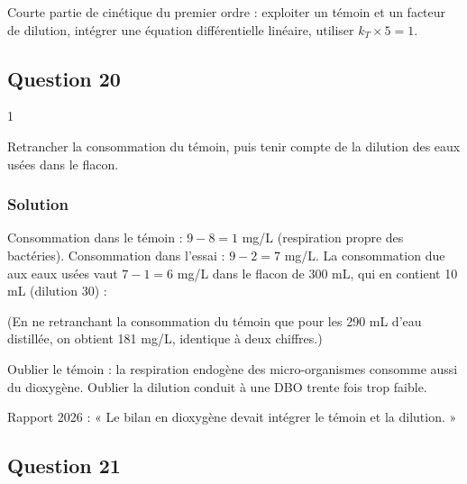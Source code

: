 \documentclass[11pt,a4paper]{article}
\newcommand{\equationajustee}[1]{%
  \sbox{\boiteequation}{$\displaystyle #1$}%
  \ifdim\wd\boiteequation>\linewidth
    \[\resizebox{\linewidth}{!}{\usebox{\boiteequation}}\]%
  \else
    \[#1\]%
  \fi}
\begin{document}
Courte partie de cinétique du premier ordre : exploiter un témoin et un facteur de dilution, intégrer une équation différentielle linéaire, utiliser \(k_T\times5=1\).

\hypertarget{question-20}{%
\subsection{Question 20}\label{question-20}}

\begin{indication}{1}

Retrancher la consommation du témoin, puis tenir compte de la dilution des eaux usées dans le flacon.

\end{indication}

\hypertarget{solution-19}{%
\subsubsection{Solution}\label{solution-19}}

Consommation dans le témoin : \(9-8=1\) mg/L (respiration propre des bactéries). Consommation dans l'essai : \(9-2=7\) mg/L. La consommation due aux eaux usées vaut \(7-1=6\) mg/L dans le flacon de 300 mL, qui en contient 10 mL (dilution 30) :

\equationajustee{\boxed{\mathrm{DBO_5}=(7-1)\times\frac{300}{10}=1{,}8\times10^{2}\ \mathrm{mg\,L^{-1}}}}

(En ne retranchant la consommation du témoin que pour les 290 mL d'eau distillée, on obtient 181 mg/L, identique à deux chiffres.)

\begin{piege}

Oublier le témoin : la respiration endogène des micro-organismes consomme aussi du dioxygène. Oublier la dilution conduit à une DBO trente fois trop faible.

\end{piege}

\begin{jury}

Rapport 2026 : « Le bilan en dioxygène devait intégrer le témoin et la dilution. »

\end{jury}

\hypertarget{question-21}{%
\subsection{Question 21}\label{question-21}}
\end{document}
